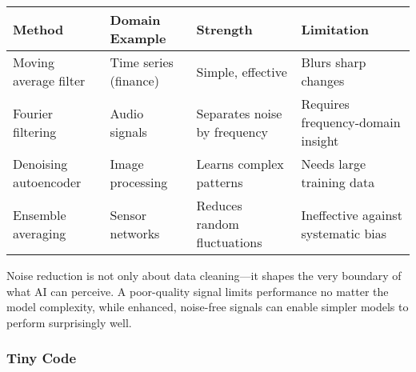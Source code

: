\documentclass[
  letterpaper,
  DIV=11,
  numbers=noendperiod]{scrreprt}
\begin{document}
\begin{longtable}[]{@{}
  >{\raggedright\arraybackslash}p{}
  >{\raggedright\arraybackslash}p{}
  >{\raggedright\arraybackslash}p{}
  >{\raggedright\arraybackslash}p{}@{}}
\toprule\noalign{}
\begin{minipage}[b]{\linewidth}\raggedright
Method
\end{minipage} & \begin{minipage}[b]{\linewidth}\raggedright
Domain Example
\end{minipage} & \begin{minipage}[b]{\linewidth}\raggedright
Strength
\end{minipage} & \begin{minipage}[b]{\linewidth}\raggedright
Limitation
\end{minipage} \\
\midrule\noalign{}
\endhead
\bottomrule\noalign{}
\endlastfoot
Moving average filter & Time series (finance) & Simple, effective &
Blurs sharp changes \\
Fourier filtering & Audio signals & Separates noise by frequency &
Requires frequency-domain insight \\
Denoising autoencoder & Image processing & Learns complex patterns &
Needs large training data \\
Ensemble averaging & Sensor networks & Reduces random fluctuations &
Ineffective against systematic bias \\
\end{longtable}

Noise reduction is not only about data cleaning---it shapes the very
boundary of what AI can perceive. A poor-quality signal limits
performance no matter the model complexity, while enhanced, noise-free
signals can enable simpler models to perform surprisingly well.

\subsubsection{Tiny Code}\label{tiny-code-74}
\end{document}
